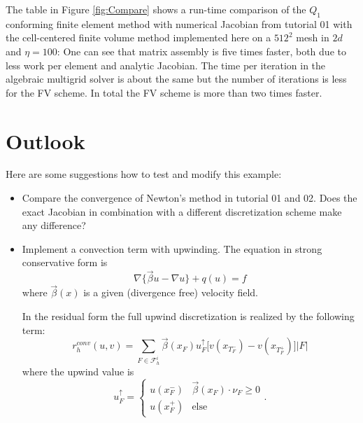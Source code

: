 \documentclass[a4paper,12pt]{article}
\begin{document}
The table in Figure \ref{fig:Compare} shows a run-time comparison
of the $Q_1$ conforming finite element method with numerical Jacobian
from tutorial 01 with the cell-centered finite volume method implemented here
on a $512^2$ mesh in $2d$ and $\eta=100$:
One can see that matrix assembly is five times faster, both due to less work
per element and analytic Jacobian. The time per iteration in the algebraic multigrid
solver is about the same but the number of iterations is less for the FV scheme.
In total the FV scheme is more than two times faster.

\section{Outlook}

Here are some suggestions how to test and modify this example:
\begin{itemize}
\item Compare the convergence of Newton's method in tutorial 01 and 02. Does the
exact Jacobian in combination with a different discretization scheme make any difference?
\item Implement a convection term with upwinding. The equation in strong conservative
form is
$$ \nabla\{ \vec\beta u - \nabla u\} + q(u) = f $$
where $\vec\beta(x)$ is a given (divergence free) velocity field. 

In the residual form the full upwind discretization is realized by the following
term:
$$r_h^{conv}(u,v) = \sum_{F\in\mathcal{F}_h^i} \vec\beta(x_F) u^\uparrow_F
\bigl[v(x_{T_F^-}) - v(x_{T_F^+})\bigr] |F|$$
where the upwind value is
$$ u^\uparrow_F = \left\{\begin{array}{ll}
u(x_F^-) & \vec\beta(x_F)\cdot\nu_F\geq 0 \\
u(x_F^+) & \text{else}
\end{array}\right . .$$
\end{itemize}

%
%
\end{document}
